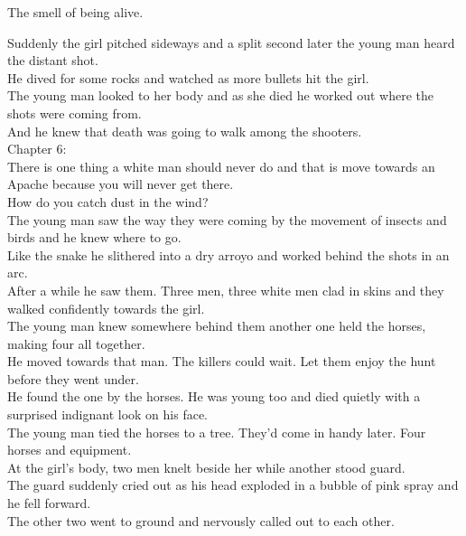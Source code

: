 The smell of being alive. \\




Suddenly the girl pitched sideways and a split second later the young man heard the distant shot. \\
He dived for some rocks and watched as more bullets hit the girl. \\
The young man looked to her body and as she died he worked out where the shots were coming from. \\

And he knew that death was going to walk among the shooters. \\

Chapter 6: \\

There is one thing a white man should never do and that is move towards an Apache because you will never get there. \\
How do you catch dust in the wind? \\
The young man saw the way they were coming by the movement of insects and birds and he knew where to go. \\
Like the snake he slithered into a dry arroyo and worked behind the shots in an arc. \\

After a while he saw them. Three men, three white men clad in skins and they walked confidently towards the girl. \\
The young man knew somewhere behind them another one held the horses, making four all together. \\

He moved towards that man. The killers could wait. Let them enjoy the hunt before they went under. \\
He found the one by the horses. He was young too and died quietly with a surprised indignant look on his face. \\
The young man tied the horses to a tree. They'd come in handy later. Four horses and equipment. \\

At the girl's body, two men knelt beside her while another stood guard. \\
The guard suddenly cried out as his head exploded in a bubble of pink spray and he fell forward. \\
The other two went to ground and nervously called out to each other. \\

